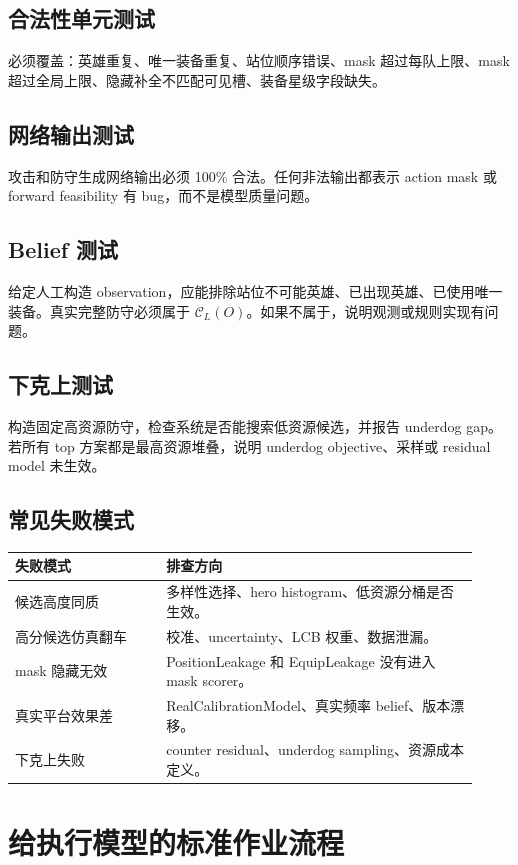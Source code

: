 \documentclass[UTF8,12pt,openany]{ctexbook}
\newcommand{\Ccal}{\mathcal{C}}
\begin{document}
\section{合法性单元测试}
必须覆盖：英雄重复、唯一装备重复、站位顺序错误、mask 超过每队上限、mask 超过全局上限、隐藏补全不匹配可见槽、装备星级字段缺失。

\section{网络输出测试}
攻击和防守生成网络输出必须 100\% 合法。任何非法输出都表示 action mask 或 forward feasibility 有 bug，而不是模型质量问题。

\section{Belief 测试}
给定人工构造 observation，应能排除站位不可能英雄、已出现英雄、已使用唯一装备。真实完整防守必须属于 $\Ccal_L(O)$。如果不属于，说明观测或规则实现有问题。

\section{下克上测试}
构造固定高资源防守，检查系统是否能搜索低资源候选，并报告 underdog gap。若所有 top 方案都是最高资源堆叠，说明 underdog objective、采样或 residual model 未生效。

\section{常见失败模式}
\begin{longtable}{p{0.30\linewidth}p{0.62\linewidth}}
\toprule
失败模式 & 排查方向 \\
\midrule
候选高度同质 & 多样性选择、hero histogram、低资源分桶是否生效。\\
高分候选仿真翻车 & 校准、uncertainty、LCB 权重、数据泄漏。\\
mask 隐藏无效 & PositionLeakage 和 EquipLeakage 没有进入 mask scorer。\\
真实平台效果差 & RealCalibrationModel、真实频率 belief、版本漂移。\\
下克上失败 & counter residual、underdog sampling、资源成本定义。\\
\bottomrule
\end{longtable}


\chapter{给执行模型的标准作业流程}
\end{document}
